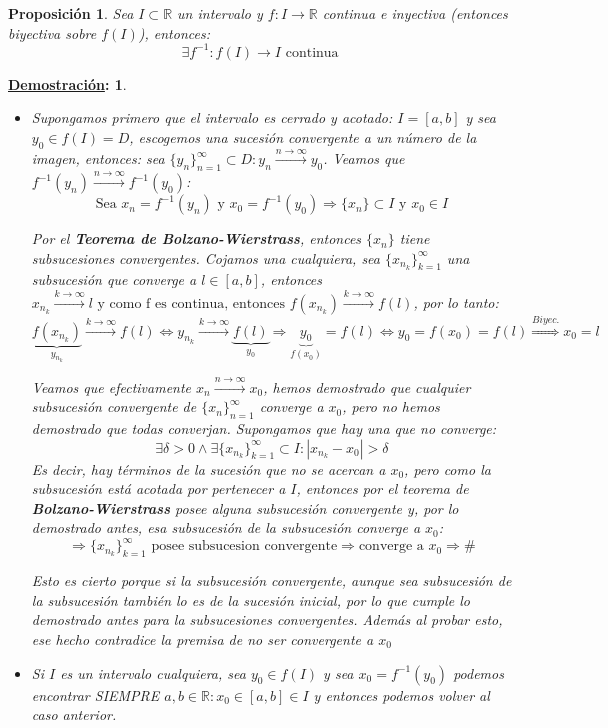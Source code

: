 \documentclass[10pt,a4paper,openright]{book}
\theoremstyle{break}
\newtheorem*{prop}{Proposición}
\newtheorem*{demo}{\underline{Demostración}:}
\begin{document}
\begin{prop}
Sea $I\subset \mathbb R$ un intervalo y $f: I\longrightarrow \mathbb R$ continua e inyectiva (entonces biyectiva sobre $f(I)$), entonces:
$$\exists f^{-1}: f(I)\longrightarrow I\mbox{ continua}$$
\end{prop}
\begin{demo}
\begin{itemize}
\item Supongamos primero que el intervalo es cerrado y acotado: $I=[a,b]$ y sea $y_0\in f(I)=D$, escogemos una sucesión convergente a un número de la imagen, entonces: sea $\{y_n\}_{n=1}^\infty \subset D: y_n\xrightarrow{n\rightarrow \infty} y_0$. Veamos que $f^{-1}(y_n)\xrightarrow{n\rightarrow\infty} f^{-1}(y_0)$:
$$\mbox{Sea }x_n=f^{-1}(y_n)\mbox{ y }x_0=f^{-1}(y_0)\Rightarrow \{x_n\}\subset I\mbox{ y }x_0\in I$$

Por el \textbf{Teorema de Bolzano-Wierstrass}, entonces $\{x_n\}$ tiene subsucesiones convergentes. Cojamos una cualquiera, sea $\{x_{n_k}\}_{k=1}^\infty$ una subsucesión que converge a $l\in [a,b]$, entonces $x_{n_k}\xrightarrow{k\rightarrow \infty }l\mbox{ y como f es continua, entonces } f(x_{n_k})\xrightarrow{k\rightarrow \infty}f(l)$, por lo tanto:
$$\underbrace{f(x_{n_k})}_{y_{n_k}}\xrightarrow{k\rightarrow \infty}f(l)\Leftrightarrow y_{n_k}\xrightarrow{k\rightarrow \infty}\underbrace{f(l)}_{y_0}\Rightarrow \underbrace{y_0}_{f(x_0)}=f(l)\Leftrightarrow y_0=f(x_0)=f(l)\stackrel{Biyec.}{\Rightarrow}x_0=l$$

Veamos que efectivamente $x_n\xrightarrow{n\rightarrow\infty}x_0$, hemos demostrado que cualquier subsucesión convergente de $\{x_n\}_{n=1}^\infty$ converge a $x_0$, pero no hemos demostrado que todas converjan. Supongamos que hay una que no converge:
$$\exists \delta>0 \wedge \exists \{x_{n_k}\}_{k=1}^\infty\subset I: |x_{n_k}-x_0|>\delta$$
Es decir, hay términos de la sucesión que no se acercan a $x_0$, pero como la subsucesión está acotada por pertenecer a $I$, entonces por el teorema de \textbf{Bolzano-Wierstrass} posee alguna subsucesión convergente y, por lo demostrado antes, esa subsucesión de la subsucesión converge a $x_0$:
$$\Rightarrow \{x_{n_k}\}_{k=1}^\infty\mbox{ posee subsucesion convergente}\Rightarrow \mbox{converge a }x_0\Rightarrow \#$$

Esto es cierto porque si la subsucesión convergente, aunque sea subsucesión de la subsucesión también lo es de la sucesión inicial, por lo que cumple lo demostrado antes para la subsucesiones convergentes. Además al probar esto, ese hecho contradice la premisa de no ser convergente a $x_0$

\item Si $I$ es un intervalo cualquiera, sea $y_0\in f(I)$ y sea $x_0=f^{-1}(y_0)$ podemos encontrar SIEMPRE $a,b\in \mathbb R: x_0\in [a,b]\in I$ y entonces podemos volver al caso anterior.
\end{itemize}
\end{demo}
\end{document}
